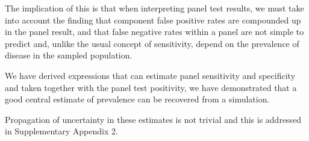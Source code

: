 \documentclass[a4paper, 12pt, twoside]{article}
\begin{document}
The implication of this is that when interpreting panel test results, we must take into account the finding that component false positive rates are compounded up in the panel result, and that false negative rates within a panel are not simple to predict and, unlike the usual concept of sensitivity, depend on the prevalence of disease in the sampled population.

We have derived expressions that can estimate panel sensitivity and specificity and taken together with the panel test positivity, we have demonstrated that a good central estimate of prevalence can be recovered from a simulation.

Propagation of uncertainty in these estimates is not trivial and this is addressed in Supplementary Appendix 2.


\end{document}
